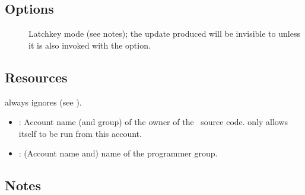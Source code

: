 \subsection*{Options}

\begin{description}
\item[]
   Latchkey mode (see notes); the update produced will be invisible to
    unless it is also invoked with the  option.
\end{description}

\subsection*{Resources}

 always ignores  (see ).

\begin{itemize}
\item
   : Account name (and group) of the owner of the
   \aipspp\ source code.   only allows itself to be run from this
   account.

\item
   : (Account name and) name of the \aipspp
   programmer group.
\end{itemize}

\subsection*{Notes}


